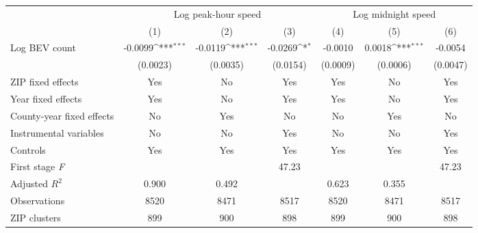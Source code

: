 {
\def\sym#1{\ifmmode^{#1}\else\(^{#1}\)\fi}
\begin{tabular}{l*{6}{c}}
\hline\hline
                    &\multicolumn{3}{c}{Log peak-hour speed}                          &\multicolumn{3}{c}{Log midnight speed}                           \\
                    &\multicolumn{1}{c}{(1)}         &\multicolumn{1}{c}{(2)}         &\multicolumn{1}{c}{(3)}         &\multicolumn{1}{c}{(4)}         &\multicolumn{1}{c}{(5)}         &\multicolumn{1}{c}{(6)}         \\
\hline
Log BEV count       &     -0.0099\sym{***}&     -0.0119\sym{***}&     -0.0269\sym{*}  &     -0.0010         &      0.0018\sym{***}&     -0.0054         \\
                    &    (0.0023)         &    (0.0035)         &    (0.0154)         &    (0.0009)         &    (0.0006)         &    (0.0047)         \\
\hline
ZIP fixed effects   &         Yes         &          No         &         Yes         &         Yes         &          No         &         Yes         \\
Year fixed effects  &         Yes         &          No         &         Yes         &         Yes         &          No         &         Yes         \\
County-year fixed effects&          No         &         Yes         &          No         &          No         &         Yes         &          No         \\
Instrumental variables&          No         &          No         &         Yes         &          No         &          No         &         Yes         \\
Controls            &         Yes         &         Yes         &         Yes         &         Yes         &         Yes         &         Yes         \\
First stage \textit{F}&                     &                     &       47.23         &                     &                     &       47.23         \\
Adjusted \(R^2\)    &       0.900         &       0.492         &                     &       0.623         &       0.355         &                     \\
Observations        &        8520         &        8471         &        8517         &        8520         &        8471         &        8517         \\
ZIP clusters        &         899         &         900         &         898         &         899         &         900         &         898         \\

\end{tabular}}
